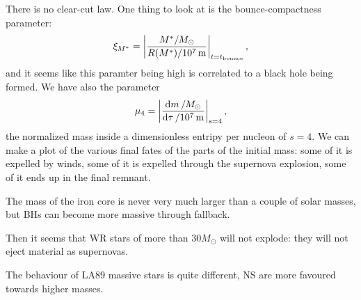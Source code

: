 \documentclass[main.tex]{subfiles}
\begin{document}
There is no clear-cut law. One thing to look at is the bounce-compactness parameter: 
%
\begin{align}
  \xi_{M^*} = \abs{\frac{M^{*} / M_{\odot}}{R(M^{*}) / \SI{e7}{m}}}_{t = t _{\text{bounce}}}
\,,
\end{align}
%
and it seems like this paramter being high is correlated to a black hole being formed. 
We have also the parameter 
%
\begin{align}
  \mu_{4}  = \abs{\frac{ \dd{m} / M_{\odot}}{ \dd{\tau } / \SI{e7}{m}}}_{s=4}
\,,
\end{align}
%
the normalized mass inside a dimensionless entripy per nucleon of \(s=4\). 
We can make a plot of the various final fates of the parts of the initial mass: some of it is expelled by winds, some of it is expelled through the supernova explosion, some of it ends up in the final remnant.

The mass of the iron core is never very much larger than a couple of solar masses, but BHs can become more massive through fallback. 

Then it seems that WR stars of more than \(30 M_{\odot}\) will not explode: they will not eject material as supernovas. 


The behaviour of LA89 massive stars is quite different, NS are more favoured towards higher masses. 
\end{document}
